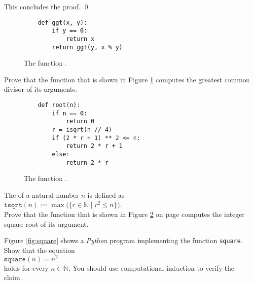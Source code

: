 This concludes the proof. \qed

\begin{figure}[!h]
  \centering
\begin{verbatim}
    def ggt(x, y):
        if y == 0:
            return x
        return ggt(y, x % y)
\end{verbatim}
\vspace*{-0.3cm}
  \caption{The function .}
  \label{fig:gcd}
\end{figure}

\exerciseEng
Prove that the function  that is shown in Figure \ref{fig:gcd} computes the greatest common divisor
of its arguments. \eox

\begin{figure}[!h]
  \centering
\begin{verbatim}
    def root(n):
        if n == 0:
            return 0
        r = isqrt(n // 4)
        if (2 * r + 1) ** 2 <= n:
            return 2 * r + 1
        else:
            return 2 * r
\end{verbatim}
\vspace*{-0.3cm}
  \caption{The function .}
  \label{fig:isqrt}
\end{figure} 

\exerciseEng
The  of a natural number $n$ is defined as 
\\[0.2cm]
\hspace*{1.3cm}
$\texttt{isqrt}(n) := \max\bigl(\{ r \in \mathbb{N} \mid r^2 \leq n \}\bigr)$.
\\[0.2cm]
Prove that the function  that is shown in Figure \ref{fig:isqrt} on page \pageref{fig:isqrt}
computes the integer square root of its argument. \eox
\pagebreak

\exerciseEng
Figure \ref{fig:square} shows a \textsl{Python} program implementing the function \texttt{square}.  Show that the equation
\\[0.2cm]
\hspace*{1.3cm}
$\mathtt{square}(n) = n^2$
\\[0.2cm]
holds for every $n \in \mathbb{N}$.  You should use computational induction to verify the claim. \eox

